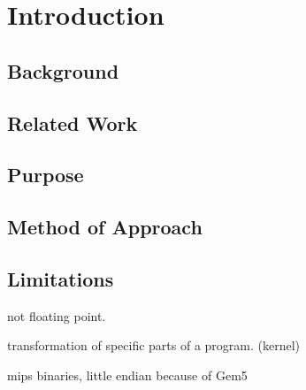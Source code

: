 \chapter{Introduction}

\section{Background}

\section{Related Work}

\section{Purpose}

\section{Method of Approach}

\section{Limitations}
not floating point.

transformation of specific parts of a program. (kernel)

mips binaries, little endian because of Gem5

